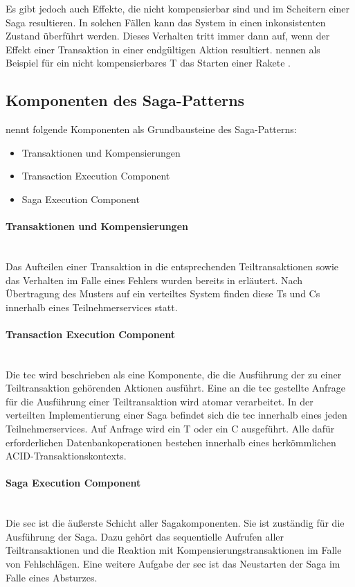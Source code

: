 Es gibt jedoch auch Effekte, die nicht kompensierbar sind und im Scheitern einer Saga resultieren. In solchen Fällen kann das System in einen inkonsistenten Zustand überführt werden. Dieses Verhalten tritt immer dann auf, wenn der Effekt einer Transaktion in einer endgültigen Aktion resultiert. \citeauthor{GarciaMolina.1987} nennen als Beispiel für ein nicht kompensierbares T das Starten einer Rakete \cite[p.257]{GarciaMolina.1987}.

\subsection{Komponenten des Saga-Patterns}
\citeauthor{GarciaMolina.1987} nennt folgende Komponenten als Grundbausteine des Saga-Patterns:
\begin{itemize}
	\item Transaktionen und Kompensierungen
	\item Transaction Execution Component
	\item Saga Execution Component
\end{itemize}

\paragraph*{Transaktionen und Kompensierungen} \mbox{} \\
Das Aufteilen einer Transaktion in die entsprechenden Teiltransaktionen sowie das Verhalten im Falle eines Fehlers wurden bereits in erläutert. Nach Übertragung des Musters auf ein verteiltes System finden diese Ts und Cs innerhalb eines Teilnehmerservices statt. 

\paragraph*{Transaction Execution Component} \mbox{} \\
Die \acrfull{tec} wird beschrieben als eine Komponente, die die Ausführung der zu einer Teiltransaktion gehörenden Aktionen ausführt. Eine an die \acrshort{tec} gestellte Anfrage für die Ausführung einer Teiltransaktion wird atomar verarbeitet. In der verteilten Implementierung einer Saga befindet sich die \acrshort{tec} innerhalb eines jeden Teilnehmerservices. Auf Anfrage wird ein T oder ein C ausgeführt. Alle dafür erforderlichen Datenbankoperationen bestehen innerhalb eines herkömmlichen ACID-Transaktionskontexts. 

\paragraph*{Saga Execution Component} \mbox{} \\
Die \acrfull{sec} ist die äußerste Schicht aller Sagakomponenten. Sie ist zuständig für die Ausführung der Saga. Dazu gehört das sequentielle Aufrufen aller Teiltransaktionen und die Reaktion mit Kompensierungstransaktionen im Falle von Fehlschlägen. Eine weitere Aufgabe der \acrshort{sec} ist das Neustarten der Saga im Falle eines Absturzes. 

